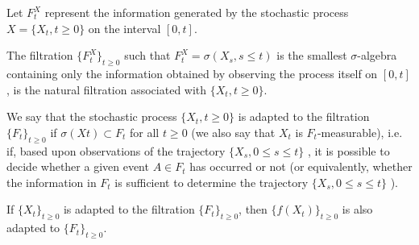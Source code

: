 \documentclass[11pt,a4paper]{book}
\theoremstyle{definition}\newtheorem{definition}{Definition}
\theoremstyle{definition}\newtheorem{fact}{Fact}
\theoremstyle{definition}\newtheorem{remark}{Remark}
\theoremstyle{definition}\newtheorem{ex}{Ex.}
\theoremstyle{definition}\newtheorem{project}{Project}
\theoremstyle{definition}\newtheorem{problem}{Problem}
\theoremstyle{definition}\newtheorem{example}{Example}
\numberwithin{theorem}{section}
\numberwithin{corollary}{chapter}
\numberwithin{assumption}{chapter}
\numberwithin{definition}{chapter}
\numberwithin{prop}{chapter}
\numberwithin{notation}{chapter}
\numberwithin{problem}{chapter}
\numberwithin{example}{chapter}
\numberwithin{fact}{chapter}
\numberwithin{ex}{chapter}
\begin{document}
Let $F_t^X$ represent the information generated by the stochastic process $X=\{X_t, t\geq 0\}$ on the interval $[0, t ]$.

The filtration $\{F_t^X\}_{t \geq 0}$ such that $F_t^X = \sigma(X_s, s \leq t)$ is the smallest $\sigma$-algebra containing only the information obtained by observing the process itself on $[0,t]$, is the natural filtration associated with $\{X_t, t\geq 0\}$.

We say that the stochastic process $\{X_t, t \geq 0\}$ is adapted to the filtration  $\{F_t\}_{t \geq 0}$ if $\sigma(Xt) \subset F_t$ for all $t \geq 0$ (we also say that $X_t$ is $F_t$-measurable), i.e. if, based upon observations of the trajectory $\{X_s, 0 \leq s \leq t\}$ , it is possible to decide whether a given event $A \in F_t$ has occurred or not (or equivalently, whether the information in $F_t$ is sufficient to determine the trajectory $\{X_s, 0 \leq s \leq t\}$ ).

If $\{X_t\}_{t \geq 0}$ is adapted to the filtration $\{F_t\}_{t \geq 0}$, then $\{f(X_t)\}_{t \geq 0}$ is also adapted to $\{F_t\}_{t \geq 0}$.
\end{document}
